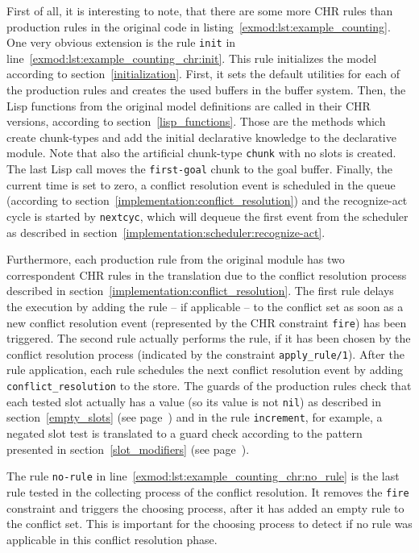 First of all, it is interesting to note, that there are some more CHR rules than production rules in the original code in listing~\ref{exmod:lst:example_counting}. One very obvious extension is the rule \lstinline|init| in line~\ref{exmod:lst:example_counting_chr:init}. This rule initializes the model according to section~\ref{initialization}. First, it sets the default utilities for each of the production rules and creates the used buffers in the buffer system. Then, the Lisp functions from the original model definitions are called in their CHR versions, according to section~\ref{lisp_functions}. Those are the methods which create chunk-types and add the initial declarative knowledge to the declarative module. Note that also the artificial chunk-type \lstinline|chunk| with no slots is created. The last Lisp call moves the \lstinline|first-goal| chunk to the goal buffer. Finally, the current time is set to zero, a conflict resolution event is scheduled in the queue (according to section~\ref{implementation:conflict_resolution}) and the recognize-act cycle is started by \lstinline|nextcyc|, which will dequeue the first event from the scheduler as described in section~\ref{implementation:scheduler:recognize-act}.

Furthermore, each production rule from the original module has two correspondent CHR rules in the translation due to the conflict resolution process described in section~\ref{implementation:conflict_resolution}. The first rule delays the execution by adding the rule -- if applicable -- to the conflict set as soon as a new conflict resolution event (represented by the CHR constraint \lstinline|fire|) has been triggered. The second rule actually performs the rule, if it has been chosen by the conflict resolution process (indicated by the constraint \lstinline|apply_rule/1|). After the rule application, each rule schedules the next conflict resolution event by adding \lstinline|conflict_resolution| to the store. The guards of the production rules check that each tested slot actually has a value (so its value is not \lstinline|nil|) as described in section~\ref{empty_slots} (see page~\pageref{empty_slots}) and in the rule \lstinline|increment|, for example, a negated slot test is translated to a guard check according to the pattern presented in section~\ref{slot_modifiers} (see page~\pageref{slot_modifiers}).

The rule \lstinline|no-rule| in line~\ref{exmod:lst:example_counting_chr:no_rule} is the last rule tested in the collecting process of the conflict resolution. It removes the \lstinline|fire| constraint and triggers the choosing process, after it has added an empty rule to the conflict set. This is important for the choosing process to detect if no rule was applicable in this conflict resolution phase.

